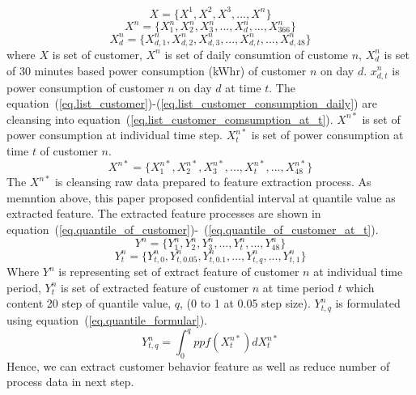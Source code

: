 \documentclass[conference]{IEEEtran}
\begin{document}
\begin{equation}
X=\big\{ X^{1}, X^{2}, X^{3}, ..., X^{n} \big\}
\label{eq.list_customer}
\end{equation}
\begin{equation}
X^{n}=\big\{ X_{1}^{n}, X_{2}^{n}, X_{3}^{n}, ...,X_{d}^{n},..., X_{366}^{n}\big\}
\label{eq.list_customer_consumption}
\end{equation}
\begin{equation}
X_{d}^{n}=\big\{ X_{d,1}^{n}, X_{d,2}^{n}, X_{d,3}^{n}, ...,X_{d,t}^{n},..., X_{d,48}^{n}\big\}
\label{eq.list_customer_consumption_daily}
\end{equation}
where $X$ is set of customer, $X^{n}$ is set of daily consumtion of custome $n$, $X_{d}^n$ is set of 30 minutes based power consumption (kWhr) of customer $n$ on day $d$. $x_{d,t}^{n}$ is power consumption of customer $n$ on day $d$ at time $t$.
The equation~(\ref{eq.list_customer})-(\ref{eq.list_customer_consumption_daily}) are cleansing into equation~(\ref{eq.list_customer_comsumption_at_t}).
$X^{n*}$ is set of power consumption at individual time step. $X_{t}^{n*}$ is set of power consumption at time $t$ of customer $n$.
\begin{equation}
X^{n*}=\big\{ X_{1}^{n*}, X_{2}^{n*}, X_{3}^{n*}, ..., X_{t}^{n*}, ..., X_{48}^{n*} \big\}
\label{eq.list_customer_comsumption_at_t}
\end{equation}
The $X^{n*}$ is cleansing raw data prepared to feature extraction process. As memntion above, this paper proposed confidential interval at quantile value as extracted feature. The extracted feature processes are shown in equation~(\ref{eq.quantile_of_customer})-~(\ref{eq.quantile_of_customer_at_t}).
\begin{equation}
  Y^{n}=\big\{ Y_{1}^{n}, Y_{2}^{n}, Y_{3}^{n}, ..., Y_{t}^{n}, ..., Y_{48}^{n} \big\}
  \label{eq.quantile_of_customer}
\end{equation}
\begin{equation}
  Y_{t}^{n}=\big\{ Y_{t,0}^{n}, Y_{t,0.05}^{n}, Y_{t,0.1}^{n}, ..., Y_{t,q}^{n}, ..., Y_{t,1}^{n} \big\}
  \label{eq.quantile_of_customer_at_t}
\end{equation}
Where $Y^{n}$ is representing set of extract feature of customer $n$ at individual time period, $Y_{t}^{n}$ is set of extracted feature of customer $n$ at time period $t$ which content 20 step of quantile value, $q$, (0 to 1 at 0.05 step size).
$Y_{t,q}^{n}$ is formulated using equation~(\ref{eq.quantile_formular}).
\begin{equation}
  Y_{t,q}^{n}=\int_{0}^{q} ppf(X_{t}^{n*}) dX_{t}^{n*}
  \label{eq.quantile_formular}
\end{equation}
Hence, we can extract customer behavior feature as well as reduce number of process data in next step.
\end{document}
